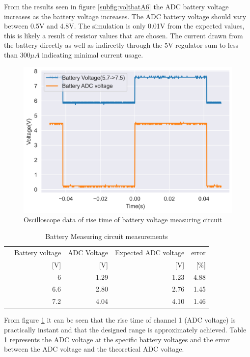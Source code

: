 From the results seen in figure \ref{subfig:voltbatA6} the ADC battery voltage increases as the battery voltage increases. The ADC battery voltage should vary between 0.5V and 4.8V. The simulation is only 0.01V from the expected values, this is likely a result of resistor values that are chosen. The current drawn from the battery directly as well as indirectly through the 5V regulator sum to less than $300\mu A$ indicating minimal current usage.




\begin{figure}[!htb]
	\centering
	\includegraphics[scale=0.45]{./Figures/A6/batmeas.png}
	\caption{Oscilloscope data of rise time of battery voltage measuring circuit}
	\label{fig:batrise}
\end{figure}



\begin{table}[!htb]
	\centering
	\footnotesize
	\caption{Battery Measuring circuit measurements}
	\begin{tabular}{lrrrr}
		\toprule
		&Battery voltage& ADC Voltage&Expected ADC voltage& error \\
		&  [V]&[V]&[V]&[\%] \\
		\midrule
		&6&1.29&1.23  &4.88   \\
		&6.6&2.80&2.76  &1.45   \\
		&7.2&4.04&4.10   &1.46  \\
		\bottomrule
	\end{tabular}
	\label{tab:batmeas}
\end{table}


From figure \ref{fig:batrise} it can be seen that the rise time of channel 1 (ADC voltage) is practically instant and that the designed range is approximately achieved. Table \ref{tab:batmeas} represents the ADC voltage at the specific battery voltages and the error between the ADC voltage and the theoretical ADC voltage.



